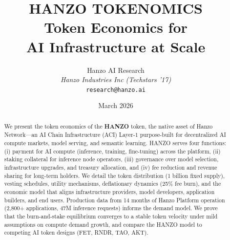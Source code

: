 \documentclass[11pt]{article}
\title{HANZO TOKENOMICS\\[0.3em]
{\large Token Economics for\\AI Infrastructure at Scale}}
\author{
    Hanzo AI Research \\
    \textit{Hanzo Industries Inc (Techstars '17)} \\
    \texttt{research@hanzo.ai}
}
\date{March 2026}
\begin{document}
\hanzocoverpage

\begin{abstract}
We present the token economics of the \textbf{HANZO} token, the native asset of
Hanzo Network---an AI Chain Infrastructure (ACI) Layer-1 purpose-built for
decentralized AI compute markets, model serving, and semantic learning. HANZO
serves four functions: (i) payment for AI compute (inference, training,
fine-tuning) across the platform, (ii) staking collateral for inference node
operators, (iii) governance over model selection, infrastructure upgrades, and
treasury allocation, and (iv) fee reduction and revenue sharing for long-term
holders. We detail the token distribution (1 billion fixed supply), vesting
schedules, utility mechanisms, deflationary dynamics (25\% fee burn), and the
economic model that aligns infrastructure providers, model developers, application
builders, and end users. Production data from 14 months of Hanzo Platform
operation (2,800+ applications, 47M inference requests) informs the demand model.
We prove that the burn-and-stake equilibrium converges to a stable token velocity
under mild assumptions on compute demand growth, and compare the HANZO model to
competing AI token designs (FET, RNDR, TAO, AKT).
\end{abstract}















\end{document}
